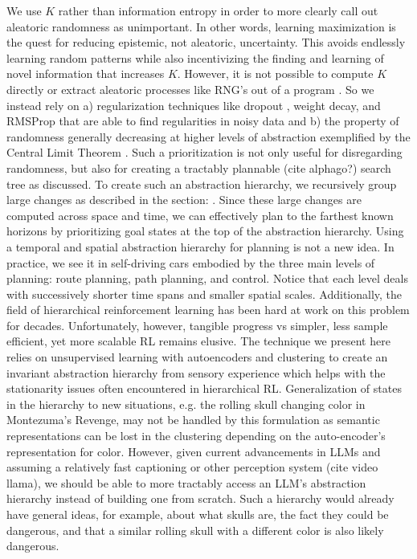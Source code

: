 \documentclass{article}
\begin{document}
We use $K$ rather than information entropy in order to more clearly call out aleatoric randomness as unimportant. In other words, learning maximization is the quest for reducing epistemic, not aleatoric, uncertainty. This avoids endlessly learning random patterns while also incentivizing the finding and learning of novel information that increases $K$. However, it is not possible to compute $K$ directly or extract aleatoric processes like RNG's out of a program \cite{wiki-kolm-cpx-uncomput}. So we instead rely on a) regularization techniques like dropout \cite{srivastava2014dropout}, weight decay\cite{krogh1991simple}\cite{loshchilov2017decoupled}, and RMSProp \cite{hinton2012}\cite{kingma2017adam} that are able to find regularities in noisy data and b) the property of randomness generally decreasing at higher levels of abstraction exemplified by the Central Limit Theorem \cite{wiki-cent-lim-theo}. Such a prioritization is not only useful for disregarding randomness, but also for creating a tractably plannable (cite alphago?) search tree as discussed. To create such an abstraction hierarchy, we recursively group large changes as described in the section: . Since these large changes are computed across space and time, we can effectively plan to the farthest known horizons by prioritizing goal states at the top of the abstraction hierarchy. Using a temporal and spatial abstraction hierarchy for planning is not a new idea. In practice, we see it in self-driving cars embodied by the three main levels of planning: route planning, path planning, and control\cite{gat1998three}. Notice that each level deals with successively shorter time spans and smaller spatial scales. Additionally, the field of hierarchical reinforcement learning\cite{BerliacHierachialRL2019} has been hard at work on this problem for decades. Unfortunately, however, tangible progress vs simpler, less sample efficient, yet more scalable RL\cite{openai2019dota} remains elusive. The technique we present here relies on unsupervised learning with autoencoders and clustering to create an invariant abstraction hierarchy from sensory experience which helps with the stationarity\cite{BerliacHierachialRL2019} issues often encountered in hierarchical RL. Generalization of states in the hierarchy to new situations, e.g. the rolling skull changing color in Montezuma's Revenge, may not be handled by this formulation as semantic representations can be lost in the clustering depending on the auto-encoder's representation for color. However, given current advancements in LLMs and assuming a relatively fast captioning\cite{li2022mplug} or other perception system\cite{wang2022yolov7} (cite video llama), we should be able to more tractably access an LLM's abstraction hierarchy instead of building one from scratch. Such a hierarchy would already have general ideas, for example, about what skulls are, the fact they could be dangerous, and that a similar rolling skull with a different color is also likely dangerous.
\end{document}
